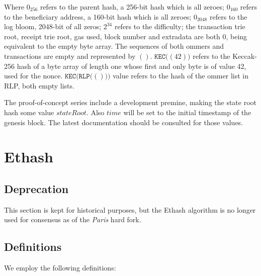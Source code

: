 \documentclass[9pt,oneside]{amsart}
\begin{document}
Where $0_{256}$ refers to the parent hash, a 256-bit hash which is all zeroes; $0_{160}$ refers to the beneficiary address, a 160-bit hash which is all zeroes; $0_{2048}$ refers to the log bloom, 2048-bit of all zeros; $2^{34}$ refers to the difficulty; the transaction trie root, receipt trie root, gas used, block number and extradata are both $0$, being equivalent to the empty byte array. The sequences of both ommers and transactions are empty and represented by $()$. $\mathtt{KEC}\big( (42) \big)$ refers to the Keccak-256 hash of a byte array of length one whose first and only byte is of value 42, used for the nonce. $\mathtt{KEC}\big(\mathtt{RLP}\big( () \big)\big)$ value refers to the hash of the ommer list in RLP, both empty lists.

The proof-of-concept series include a development premine, making the state root hash some value $stateRoot$. Also $time$ will be set to the initial timestamp of the genesis block. The latest documentation should be consulted for those values.

\section{Ethash}\label{app:ethash}
\subsection{Deprecation}
This section is kept for historical purposes, but the Ethash algorithm is no longer used for consensus as of the \textit{Paris} hard fork.

\subsection{Definitions}
We employ the following definitions:
\end{document}
